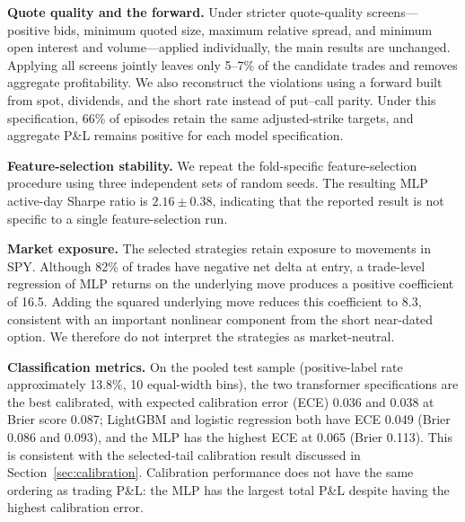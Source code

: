 \documentclass[sigconf,review]{acmart}
\begin{document}
\noindent\textbf{Quote quality and the forward.}
Under stricter quote-quality screens---positive bids, minimum quoted size, maximum relative spread, and minimum open interest and volume---applied individually, the main results are unchanged. Applying all screens jointly leaves only 5--7\% of the candidate trades and removes aggregate profitability.
We also reconstruct the violations using a forward built from spot, dividends, and the short rate instead of put--call parity. Under this specification, 66\% of episodes retain the same adjusted-strike targets, and aggregate P\&L remains positive for each model specification.

\noindent\textbf{Feature-selection stability.}
We repeat the fold-specific feature-selection procedure using three independent sets of random seeds. The resulting MLP active-day Sharpe ratio is $2.16\pm0.38$, indicating that the reported result is not specific to a single feature-selection run.

\noindent\textbf{Market exposure.}
The selected strategies retain exposure to movements in SPY. Although 82\% of trades have negative net delta at entry, a trade-level regression of MLP returns on the underlying move produces a positive coefficient of 16.5. Adding the squared underlying move reduces this coefficient to 8.3, consistent with an important nonlinear component from the short near-dated option. We therefore do not interpret the strategies as market-neutral.

\noindent\textbf{Classification metrics.}
On the pooled test sample (positive-label rate approximately 13.8\%, 10 equal-width bins), the two transformer specifications are the best calibrated, with expected calibration error (ECE) 0.036 and 0.038 at Brier score 0.087; LightGBM and logistic regression both have ECE 0.049 (Brier 0.086 and 0.093), and the MLP has the highest ECE at 0.065 (Brier 0.113). This is consistent with the selected-tail calibration result discussed in Section~\ref{sec:calibration}. Calibration performance does not have the same ordering as trading P\&L: the MLP has the largest total P\&L despite having the highest calibration error.
\end{document}
